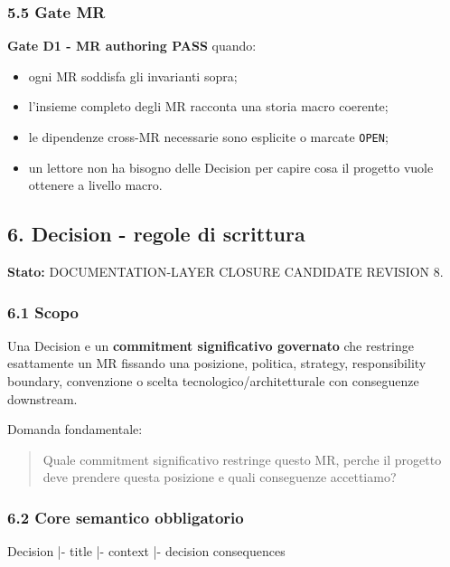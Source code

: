 \documentclass[
  9pt,
  a4paper,
]{article}
\newenvironment{Shaded}{}{}
\newcommand{\NormalTok}[1]{#1}
\providecommand{\tightlist}{%
  \setlength{\itemsep}{0pt}\setlength{\parskip}{0pt}}
\begin{document}
\subsubsection{5.5 Gate MR}\label{gate-mr}

\textbf{Gate D1 - MR authoring PASS} quando:

\begin{itemize}
\tightlist
\item
  ogni MR soddisfa gli invarianti sopra;
\item
  l'insieme completo degli MR racconta una storia macro coerente;
\item
  le dipendenze cross-MR necessarie sono esplicite o marcate
  \texttt{OPEN};
\item
  un lettore non ha bisogno delle Decision per capire cosa il progetto
  vuole ottenere a livello macro.
\end{itemize}

\subsection{6. Decision - regole di
scrittura}\label{decision---regole-di-scrittura}

\textbf{Stato:} DOCUMENTATION-LAYER CLOSURE CANDIDATE REVISION 8.

\subsubsection{6.1 Scopo}\label{scopo-1}

Una Decision e un \textbf{commitment significativo governato} che
restringe esattamente un MR fissando una posizione, politica, strategy,
responsibility boundary, convenzione o scelta tecnologico/architetturale
con conseguenze downstream.

Domanda fondamentale:

\begin{quote}
Quale commitment significativo restringe questo MR, perche il progetto
deve prendere questa posizione e quali conseguenze accettiamo?
\end{quote}

\subsubsection{6.2 Core semantico
obbligatorio}\label{core-semantico-obbligatorio}

\begin{Shaded}
\begin{Highlighting}[]
\NormalTok{Decision}
\NormalTok{|{-} title}
\NormalTok{|{-} context}
\NormalTok{|{-} decision}
\NormalTok{\textasciigrave{}{-} consequences}
\end{Highlighting}
\end{Shaded}
\end{document}
